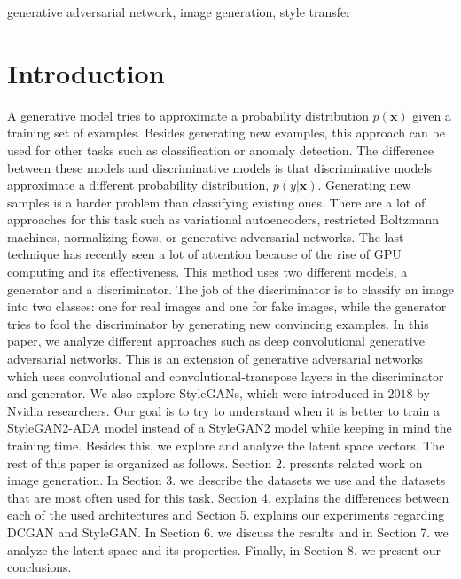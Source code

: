 \documentclass[conference]{IEEEtran}
\begin{document}
\begin{IEEEkeywords}
generative adversarial network, image generation, style transfer
\end{IEEEkeywords}

\section{Introduction}

A generative model tries to approximate a probability distribution $p(\mathbf{x})$ given a training set of examples. Besides generating new examples, this approach can be used for other tasks such as classification or anomaly detection. The difference between these models and discriminative models is that discriminative models approximate a different probability distribution, $p(y|\mathbf{x})$. Generating new samples is a harder problem than classifying existing ones. There are a lot of approaches for this task such as variational autoencoders, restricted Boltzmann machines, normalizing flows, or generative adversarial networks. The last technique has recently seen a lot of attention because of the rise of GPU computing and its effectiveness. This method uses two different models, a generator and a discriminator. The job of the discriminator is to classify an image into two classes: one for real images and one for fake images, while the generator tries to fool the discriminator by generating new convincing examples.
In this paper, we analyze different approaches such as deep convolutional generative adversarial networks. This is an extension of generative adversarial networks which uses convolutional and convolutional-transpose layers in the discriminator and generator. We also explore StyleGANs, which were introduced in $2018$ by Nvidia researchers. Our goal is to try to understand when it is better to train a StyleGAN2-ADA model instead of a StyleGAN2 model while keeping in mind the training time. Besides this, we explore and analyze the latent space vectors. The rest of this paper is organized as follows. Section 2. presents related work on image generation. In Section 3. we describe the datasets we use and the datasets that are most often used for this task. Section 4. explains the differences between each of the used architectures and Section 5. explains our experiments regarding DCGAN and StyleGAN. In Section 6. we discuss the results and in Section 7. we analyze the latent space and its properties. Finally, in Section 8. we present our conclusions.
\end{document}
